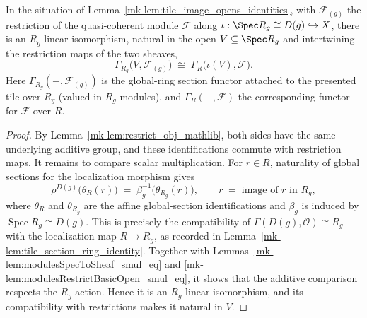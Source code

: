 \begin{lemma}
  \label{mk-lem:tile_section_comparison}
  In the situation of Lemma~\ref{mk-lem:tile_image_opens_identities}, with
  \(\mathcal{F}_{(g)}\) the restriction of the quasi-coherent module
  \(\mathcal{F}\) along \(\iota : \Spec R_g \cong D(g) \hookrightarrow X\), there is an \(R_g\)-linear
  isomorphism, natural in the open \(V \subseteq \Spec R_g\) and intertwining the restriction maps of the
  two sheaves,
  \[
    \Gamma_{R_g}\bigl(V, \mathcal{F}_{(g)}\bigr) \;\cong\; \Gamma_R\bigl(\iota(V), \mathcal{F}\bigr).
  \]
  Here \(\Gamma_{R_g}(-, \mathcal{F}_{(g)})\) is the global-ring section functor attached to the
  presented tile over \(R_g\) (valued in \(R_g\)-modules), and \(\Gamma_R(-, \mathcal{F})\) the
  corresponding functor for \(\mathcal{F}\) over \(R\).
\end{lemma}
\begin{proof}
  By Lemma~\ref{mk-lem:restrict_obj_mathlib}, both sides have the same underlying additive
  group, and these identifications commute with restriction maps. It remains to compare
  scalar multiplication. For \(r\in R\), naturality of global sections for the
  localization morphism gives
  \[
    \rho^{D(g)}\bigl(\theta_R(r)\bigr)
      \;=\;
    \beta_g^{-1}\bigl(\theta_{R_g}(\bar r)\bigr),
    \qquad \bar r \;=\; \text{image of } r \text{ in } R_g,
  \]
  where \(\theta_R\) and \(\theta_{R_g}\) are the affine global-section
  identifications and \(\beta_g\) is induced by
  \(\operatorname{Spec}R_g\cong D(g)\). This is precisely the compatibility of
  \(\Gamma(D(g),\mathcal O)\cong R_g\) with the localization map \(R\to R_g\), as
  recorded in Lemma~\ref{mk-lem:tile_section_ring_identity}. Together with
  Lemmas~\ref{mk-lem:modulesSpecToSheaf_smul_eq} and
  \ref{mk-lem:modulesRestrictBasicOpen_smul_eq}, it shows that the additive comparison
  respects the \(R_g\)-action. Hence it is an \(R_g\)-linear isomorphism, and its
  compatibility with restrictions makes it natural in \(V\).
\end{proof}

